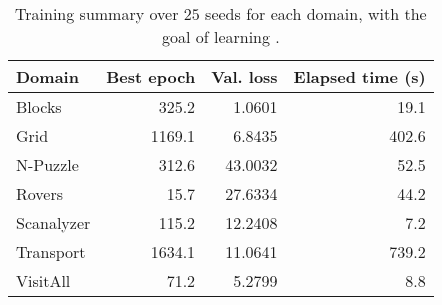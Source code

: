 \begin{table}[!h]
\centering
\caption[Training summary for learning heuristic functions]{Training summary over $25$ seeds for each domain, with the goal of learning \hnn.}
\label{tab:training_info_hnn}
\vspace{\baselineskip}
\begin{tabular}{lrrr}
\toprule
Domain    &  Best epoch &  Val. loss &  Elapsed time (s) \\
\midrule
Blocks  &       325.2 &      1.0601 &                19.1 \\
Grid &      1169.1 &      6.8435 &               402.6 \\
N-Puzzle &       312.6 &     43.0032 &                52.5 \\
Rovers  &        15.7 &     27.6334 &                44.2 \\
Scanalyzer  &       115.2 &     12.2408 &                 7.2 \\
Transport  &      1634.1 &     11.0641 &               739.2 \\
VisitAll  &        71.2 &      5.2799 &                 8.8 \\
\bottomrule
\end{tabular}
\end{table}


